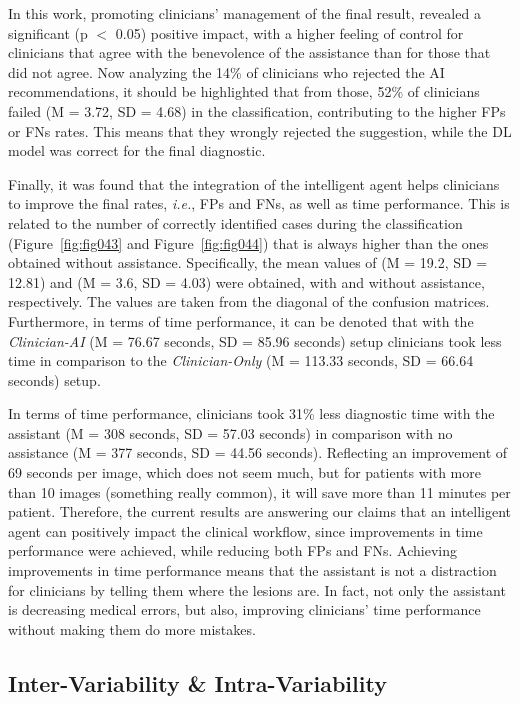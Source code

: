In this work, promoting clinicians' management of the final result, revealed a significant (p $<$ 0.05) positive impact, with a higher feeling of control for clinicians that agree with the benevolence of the assistance than for those that did not agree.
Now analyzing the 14\% of clinicians who rejected the \ac{AI} recommendations, it should be highlighted that from those, 52\% of clinicians failed (M = 3.72, SD = 4.68) in the classification, contributing to the higher \acp{FP} or \acp{FN} rates.
This means that they wrongly rejected the suggestion, while the \ac{DL} model was correct for the final diagnostic.

Finally, it was found that the integration of the intelligent agent helps clinicians to improve the final rates, {\it i.e.}, \acp{FP} and \acp{FN}, as well as time performance.
This is related to the number of correctly identified cases during the classification (Figure~\ref{fig:fig043} and Figure~\ref{fig:fig044}) that is always higher than the ones obtained without assistance.
Specifically, the mean values of (M = 19.2, SD = 12.81) and (M = 3.6, SD = 4.03) were obtained, with and without assistance, respectively.
The values are taken from the diagonal of the confusion matrices.
Furthermore, in terms of time performance, it can be denoted that with the {\it Clinician-AI} (M = 76.67 seconds, SD = 85.96 seconds) setup clinicians took less time in comparison to the {\it Clinician-Only} (M = 113.33 seconds, SD = 66.64 seconds) setup.

In terms of time performance, clinicians took 31\% less diagnostic time with the assistant (M = 308 seconds, SD = 57.03 seconds) in comparison with no assistance (M = 377 seconds, SD = 44.56 seconds).
Reflecting an improvement of 69 seconds per image, which does not seem much, but for patients with more than 10 images (something really common), it will save more than 11 minutes per patient.
Therefore, the current results are answering our claims that an intelligent agent can positively impact the clinical workflow, since improvements in time performance were achieved, while reducing both \acp{FP} and \acp{FN}.
Achieving improvements in time performance means that the assistant is not a distraction for clinicians by telling them where the lesions are.
In fact, not only the assistant is decreasing medical errors, but also, improving clinicians' time performance without making them do more mistakes.

\subsection{Inter-Variability \& Intra-Variability}
\label{sec:app003004008}

